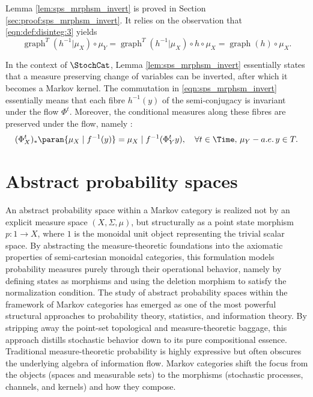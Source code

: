 \documentclass[12pt,oneside,pb-diagram]{article}
\DeclareMathOperator{\graph}{graph}
\begin{document}
Lemma \ref{lem:sps_mrphsm_invert} is proved in Section \ref{sec:proof:sps_mrphsm_invert}. It relies on the observation that \eqref{eqn:def:disinteg:3} yields
%
\begin{equation} \label{eqn:jsp3z}
	\graph^T(h^{-1}|\mu_X) \circ \mu_Y = \graph^T(h^{-1}|\mu_X) \circ h \circ \mu_X = \graph(h) \circ \mu_X.
\end{equation}
%

\begin{Erg}{}{} 
	In the context of $\StochCat$, Lemma \ref{lem:sps_mrphsm_invert} essentially states that a measure preserving change of variables can be inverted, after which it becomes a Markov kernel. The commutation in \eqref{eqn:sps_mrphsm_invert} essentially means that each fibre $h^{-1}(y)$ of the semi-conjugacy is invariant under the flow $\Phi^t$. Moreover, the conditional measures along these fibres are preserved under the flow, namely :
	\[ (\Phi_X^t)_* \paran{ \mu_X \mid f^{-1}(y) } = \mu_X \mid f^{-1}( \Phi_Y^t y ) , \quad \forall t\in \Time, \, \mu_Y-a.e. \, y\in T. \]
\end{Erg}
\section{Abstract probability spaces}

An abstract probability space within a Markov category is realized not by an explicit measure space $(X, \Sigma, \mu)$, but structurally as a point state morphism $p: 1 \to X$, where $1$ is the monoidal unit object representing the trivial scalar space. By abstracting the measure-theoretic foundations into the axiomatic properties of semi-cartesian monoidal categories, this formulation models probability measures purely through their operational behavior, namely by defining states as morphisms and using the deletion morphism to satisfy the normalization condition. The study of abstract probability spaces \cite{stein2025random} \cite{EnsarguetPerrone2023cat} \cite{BraithwaiteEtAl2023compos} \cite{KamiyaWelliaveetil2021bayes} within the framework of Markov categories has emerged as one of the most powerful structural approaches to probability theory, statistics, and information theory. By stripping away the point-set topological and measure-theoretic baggage, this approach distills stochastic behavior down to its pure compositional essence. Traditional measure-theoretic probability is highly expressive but often obscures the underlying algebra of information flow. Markov categories shift the focus from the objects (spaces and measurable sets) to the morphisms (stochastic processes, channels, and kernels) and how they compose.
\end{document}
